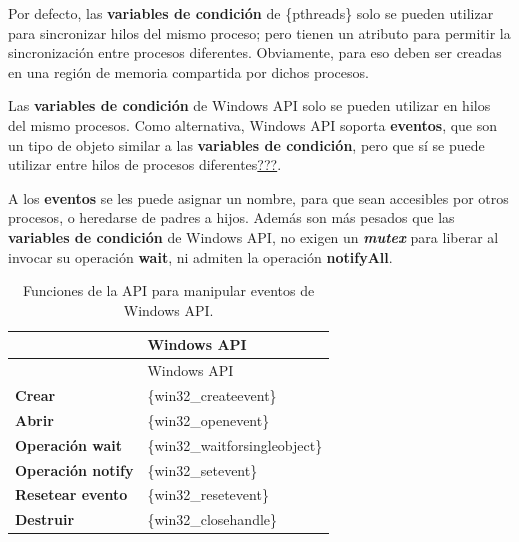 Por defecto, las \textbf{variables de condición} de \{pthreads\} solo se
pueden utilizar para sincronizar hilos del mismo proceso; pero tienen un
atributo para permitir la sincronización entre procesos diferentes.
Obviamente, para eso deben ser creadas en una región de memoria
compartida por dichos procesos.

Las \textbf{variables de condición} de Windows API solo se pueden
utilizar en hilos del mismo procesos. Como alternativa, Windows API
soporta \textbf{eventos}, que son un tipo de objeto similar a las
\textbf{variables de condición}, pero que sí se puede utilizar entre
hilos de procesos diferentes\hyperref[Win32-EventObjects]{???}.

A los \textbf{eventos} se les puede asignar un nombre, para que sean
accesibles por otros procesos, o heredarse de padres a hijos. Además son
más pesados que las \textbf{variables de condición} de Windows API, no
exigen un \textbf{\emph{mutex}} para liberar al invocar su operación
\textbf{wait}, ni admiten la operación \textbf{notifyAll}.

\begin{longtable}[]{@{}
  >{\raggedright\arraybackslash}p{}
  >{\raggedright\arraybackslash}p{}@{}}
\caption{Funciones de la API para manipular eventos de Windows
API.}\tabularnewline
\toprule\noalign{}
\begin{minipage}[b]{\linewidth}\raggedright
\end{minipage} & \begin{minipage}[b]{\linewidth}\raggedright
Windows API
\end{minipage} \\
\midrule\noalign{}
\endfirsthead
\toprule\noalign{}
\begin{minipage}[b]{\linewidth}\raggedright
\end{minipage} & \begin{minipage}[b]{\linewidth}\raggedright
Windows API
\end{minipage} \\
\midrule\noalign{}
\endhead
\bottomrule\noalign{}
\endlastfoot
\textbf{Crear} & \{win32\_createevent\} \\
\textbf{Abrir} & \{win32\_openevent\} \\
\textbf{Operación wait} & \{win32\_waitforsingleobject\} \\
\textbf{Operación notify} & \{win32\_setevent\} \\
\textbf{Resetear evento} & \{win32\_resetevent\} \\
\textbf{Destruir} & \{win32\_closehandle\} \\
\end{longtable}

